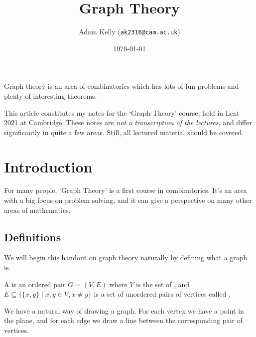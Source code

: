 \documentclass[a4paper]{scrartcl}
\title{Graph Theory}
\author{Adam Kelly (\texttt{ak2316@cam.ac.uk})}
\date{\today}
\begin{document}
\maketitle

Graph theory is an area of combinatorics which has lots of fun problems and plenty of interesting theorems.


This article constitutes my notes for the `Graph Theory' course, held in Lent 2021 at Cambridge. These notes are \emph{not a transcription of the lectures}, and differ significantly in quite a few areas. Still, all lectured material should be covered.


\tableofcontents





\section{Introduction}

For many people, `Graph Theory' is a first course in combinatorics. It's an area with a big focus on problem solving, and it can give a perspective on many other areas of mathematics.  

\subsection{Definitions}

We will begin this handout on graph theory naturally by defining what a graph is.

\begin{definition}[Graph]
	A  is an ordered pair $G = (V, E)$ where $V$ is the set of , and $E \subseteq \{ \{x,y\} \mid x, y \in V, x \neq y \}$ is a set of unordered pairs of vertices called .
\end{definition}

We have a natural way of drawing a graph. For each vertex we have a point in the plane, and for each edge we draw a line between the corresponding pair of vertices.
\end{document}
